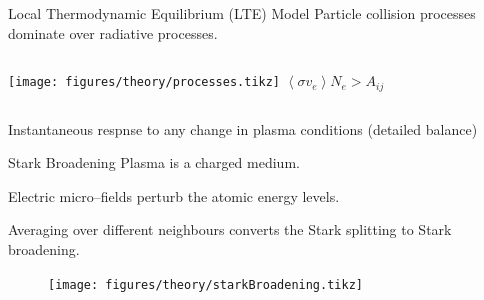 \documentclass[dvipsnames]{beamer}
\begin{document}
\begin{frame}{Local Thermodynamic Equilibrium (LTE) Model}
 Particle collision processes dominate over radiative processes.
 \begin{columns}
   \texttt{[image: figures/theory/processes.tikz]}
  $\left<\sigma v_e \right> N_e > A_{ij}$
 \end{columns}


Instantaneous respnse to any change in plasma conditions (detailed balance)
\end{frame}

\begin{frame}{Stark Broadening}
 Plasma is a charged medium.

 Electric micro--fields perturb the atomic energy levels.

 Averaging over different neighbours converts the Stark splitting to Stark broadening.
\begin{figure}
 \texttt{[image: figures/theory/starkBroadening.tikz]}
\end{figure}
\end{frame}
\end{document}
